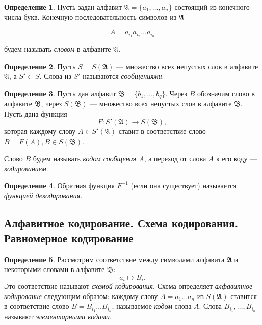 \documentclass{article}
\theoremstyle{plain}
\theoremstyle{definition}
\newtheorem{definition}{Определение}[subsection]
\begin{document}
\begin{definition}
	Пусть задан алфавит \(\mathfrak{A} = \{a_1, \ldots, a_n\}\) состоящий из конечного числа букв. Конечную последовательность символов из \(\mathfrak{A}\)

	\[
		A = a_{i_1}a_{i_2}\ldots a_{i_n}
	\]

	будем называть \textit{словом} в алфавите \(\mathfrak{A}\).
\end{definition}

\begin{definition}
	Пусть \(S = S(\mathfrak{A})\) --- множество всех непустых слов в алфавите \(\mathfrak{A}\), а \(S' \subset S\). Слова из \(S'\) называются \textit{сообщениями}.
\end{definition}

\begin{definition}
	Пусть дан алфавит \(\mathfrak{B} = \{b_1, \ldots, b_q\}\). Через \(B\) обозначим слово в алфавите \(\mathfrak{B}\), через \(S(\mathfrak{B})\) --- множество всех непустых слов в алфавите \(\mathfrak{B}\). Пусть дана функция \[F \colon S'(\mathfrak{A}) \rightarrow S(\mathfrak{B}),\] которая каждому слову \(A \in S'(\mathfrak{A})\) ставит в соответствие слово \(B = F(A), B \in S(\mathfrak{B})\).

	Слово \(B\) будем называть \textit{кодом сообщения \(A\)}, а переход от слова \(A\) к его коду --- \textit{кодированием}.
\end{definition}

\begin{definition}
	Обратная функция \(F^{-1}\) (если она существует) называется \textit{функцией декодирования}.
\end{definition}

\subsection{Алфавитное кодирование. Схема кодирования. Равномерное кодирование}

\begin{definition}
	Рассмотрим соответствие между символами алфавита \(\mathfrak{A}\) и некоторыми словами в алфавите \(\mathfrak{B}\): \[a_i \mapsto B_i.\] Это соответствие называют \textit{схемой кодирования}. Схема определяет \textit{алфавитное кодирование} следующим образом: каждому слову \(A = a_1 \ldots a_n\) из \(S(\mathfrak{A})\) ставится в соответствие слово \(B = B_{i_1}\ldots B_{i_n}\), называемое \textit{кодом} слова \(A\). Слова \(B_{i_1}, \ldots, B_{i_n}\) называют \textit{элементарными кодами}. 
\end{definition}
\end{document}
